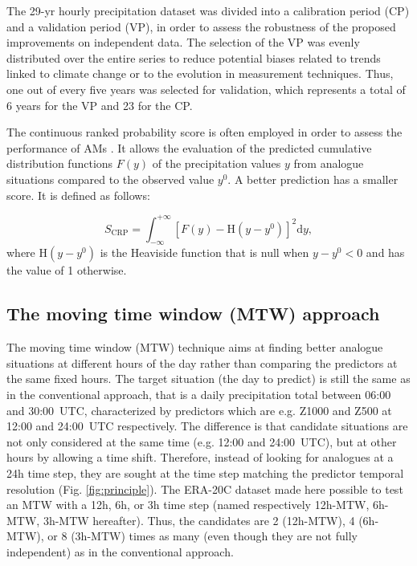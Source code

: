 \documentclass[hess, manuscript]{copernicus}
\begin{document}
	The 29-yr hourly precipitation dataset was divided into a calibration period (CP) and a validation period (VP), in order to assess the robustness of the proposed improvements on independent data. The selection of the VP was evenly distributed over the entire series \citep{BenDaoud2010} to reduce potential biases related to trends linked to climate change or to the evolution in measurement techniques. Thus, one out of every five years was selected for validation, which represents a total of 6 years for the VP and 23 for the CP.
	
	The continuous ranked probability score \citep[CRPS,][]{Brown1974, Matheson1976, Hersbach2000} is often employed in order to assess the performance of AMs \citep[see, e.g.,][]{Bontron2004, Bontron2005, BenDaoud2008, Horton2012, Marty2012, Radanovics2013, Chardon2014, Junk2015, BenDaoud2016, Caillouet2016}. It allows the evaluation of the predicted cumulative distribution functions $F(y)$ of the precipitation values $y$ from analogue situations compared to the observed value $y^{0}$. A better prediction has a smaller score. It is defined as follows:
	
	\begin{equation}
	\label{eq:CRPS}
	S_{\text{CRP}} = \int_{-\infty}^{+\infty} \left[ F(y)-\text{H}(y-y^{0})\right]^{2} \text{d}y ,  
	\end{equation}
	where $\text{H}(y-y^{0})$ is the Heaviside function that is null when $y-y^{0}<0$ and has the value of 1 otherwise.
	
	
	\subsection{The moving time window (MTW) approach}
	\label{sec:mtw}
	
	The moving time window (MTW) technique aims at finding better analogue situations at different hours of the day rather than comparing the predictors at the same fixed hours. The target situation (the day to predict) is still the same as in the conventional approach, that is a daily precipitation total between 06:00 and 30:00~UTC, characterized by predictors which are e.g. Z1000 and Z500 at 12:00 and 24:00~UTC respectively. The difference is that candidate situations are not only considered at the same time (e.g. 12:00 and 24:00~UTC), but at other hours by allowing a time shift. Therefore, instead of looking for analogues at a 24h time step, they are sought at the time step matching the predictor temporal resolution (Fig. \ref{fig:principle}). The ERA-20C dataset made here possible to test an MTW with a 12h, 6h, or 3h time step (named respectively 12h-MTW, 6h-MTW, 3h-MTW hereafter). Thus, the candidates are 2 (12h-MTW), 4 (6h-MTW), or 8 (3h-MTW) times as many (even though they are not fully independent) as in the conventional approach.
	
\end{document}
